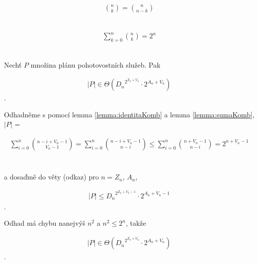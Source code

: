 \begin{lemma}\label{lemma:identitaKomb}
  \begin{align*}
    \binom{n}{k} = \binom{n}{n - k}
  \end{align*}
  \\
\end{lemma}

\begin{lemma}\label{lemma:sumaKomb}
  \begin{align*}
    \sum_{k=0}^n \binom{n}{k} = 2^n
  \end{align*}
  \\
\end{lemma}

\begin{veta}\label{veta:asymptotP}
  Nechť $P$ množina plánu pohotovostních služeb. Pak 

  \begin{align*}
    |P| \in \Theta({D_n}^{2^{Z_n + V_n}} \cdot 2^{A_n + V_n})
  \end{align*}
  .
\end{veta}
\begin{dukaz}
  Odhadněme s pomocí lemma \ref{lemma:identitaKomb} a lemma \ref{lemma:sumaKomb}, $|P|$ = 

  \begin{align*}
    \sum_{i=0}^{n} \binom{n - i + V_n - 1}{V_n - 1} =
    \sum_{i=0}^{n} \binom{n - i + V_n - 1}{n - i} \leq
    \sum_{i=0}^{n} \binom{n + V_n - 1}{n - i} =
    2^{n + V_n - 1}
  \end{align*}
  \\
  \\
  a dosaďmě do věty (odkaz) pro $n = Z_n$, $A_n$,

  \begin{align*}
    |P| \leq {D_n}^{2^{Z_n + V_n - 1}} \cdot 2^{A_n + V_n - 1}
  \end{align*}
  .

  Odhad má chybu nanejvýš $n^2$ a $n^2 \leq 2^n$, takže
  
  \begin{align*}
    |P| \in \Theta({D_n}^{2^{Z_n + V_n}} \cdot 2^{A_n + V_n})
  \end{align*}
  .
\end{dukaz}

